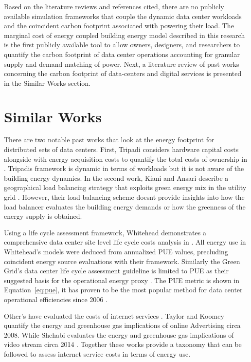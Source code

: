 Based on the literature reviews and references cited, there are no publicly available simulation frameworks that couple the dynamic data center workloads and the coincident carbon footprint associated with powering their load. The marginal cost of energy coupled building energy model described in this research is the first publicly available tool to allow owners, designers, and researchers to quantify the carbon footprint of data center operations accounting for granular supply and demand matching of power. Next, a literature review of past works concerning the carbon footprint of data-centers and digital services is presented in the Similar Works section.


\section{Similar Works}
There are two notable past works that look at the energy footprint for distributed sets of data centers. First, Tripadi considers hardware capital costs alongside with energy acquisition costs to quantify the total costs of ownership in \citep{tripadi17}. Tripadi\textsc{}s framework is dynamic in terms of workloads but it is not aware of the building energy dynamics. In the second work, Kiani and Ansari describe a geographical load balancing strategy that exploits green energy mix in the utility grid \citep{kiani17}. However, their load balancing scheme doesn\textsc{}t provide insights into how the load balancer evaluates the building energy demands or how the greenness of the energy supply is obtained. 

Using a life cycle assessment framework, Whitehead demonstrates a comprehensive data center site level life cycle costs analysis in \citep{whitehead15}. All energy use in Whitehead’s models were deduced from annualized PUE values, precluding coincident energy source evaluations with their framework. Similarly the Green Grid’s data center life cycle assessment guideline is limited to PUE as their suggested basis for the operational energy proxy \citep{tgg12}. The PUE metric is shown in Equation~\ref{eq:pue}, it has proven to be the most popular method for data center operational efficiencies since 2006 \citep{wiki_pue}.



Other’s have evaluated the costs of internet services \citep{koomey08} \citep{shehabi14}. Taylor and Koomey quantify the energy and greenhouse gas implications of online Advertising circa 2008. While Shehabi evaluates the energy and greenhouse gas implications of video stream circa 2014 \citep{shehabi14}. Together these works provide a taxonomy that can be followed to assess internet service costs in terms of energy use. 

